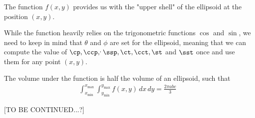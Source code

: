 The function $f(x, y)$ provides us with the "upper shell" of the ellipsoid at the position $(x, y)$.

While the function heavily relies on the trigonometric functions $\cos$ and $\sin$, we need to keep in mind that $\theta$ and $\phi$ are set for the ellipsoid, meaning that we can compute the value of $\cp, \ccp, \sp, \ssp, \ct, \cct, \st$ and $\sst$ once and use them for any point $(x, y)$.


The volume under the function is half the volume of an ellipsoid, such that 
\begin{align}
    \int_{x_{\text{min}}}^{x_{\text{max}}} \int_{y_{\text{min}}}^{y_{\text{max}}} f(x, y) \,dx \,dy = \frac{2 \pi a b c}{3}
\end{align}

[TO BE CONTINUED...?]

